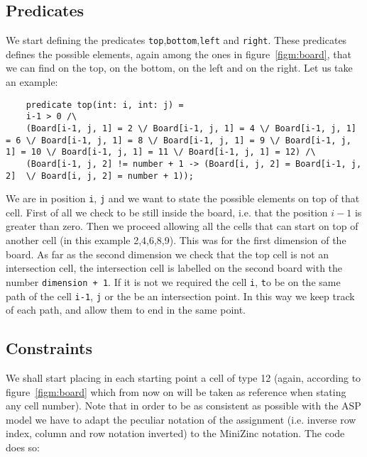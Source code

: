 \subsection{Predicates}\label{subsec:predicates}
We start defining the predicates \texttt{top},\texttt{bottom},\texttt{left} and \texttt{right}. These predicates defines the possible elements, again among the ones in figure~\ref{figm:board}, that we can find on the top, on the bottom, on the left and on the right.
Let us take an example:
\begin{verbatim}
    predicate top(int: i, int: j) =
    i-1 > 0 /\ 
    (Board[i-1, j, 1] = 2 \/ Board[i-1, j, 1] = 4 \/ Board[i-1, j, 1] = 6 \/ Board[i-1, j, 1] = 8 \/ Board[i-1, j, 1] = 9 \/ Board[i-1, j, 1] = 10 \/ Board[i-1, j, 1] = 11 \/ Board[i-1, j, 1] = 12) /\ 
    (Board[i-1, j, 2] != number + 1 -> (Board[i, j, 2] = Board[i-1, j, 2]  \/ Board[i, j, 2] = number + 1));
\end{verbatim}
We are in position \texttt{i}, \texttt{j} and we want to state the possible elements on top of that cell. First of all we check to be still inside the board, i.e. that the position $i-1$ is greater than zero. Then we proceed allowing all the cells that can start on top of another cell (in this example 2,4,6,8,9). This was for the first dimension of the board. As far as the second dimension we check that the top cell is not an intersection cell, the intersection cell is labelled on the second board with the number \texttt{dimension + 1}. If it is not we required the cell \texttt{i}, \texttt to be on the same path of the cell \texttt{i-1}, \texttt{j} or the be an intersection point. In this way we keep track of each path, and allow them to end in the same point.

\subsection{Constraints}
We shall start placing in each starting point a cell of type 12 (again, according to figure~\ref{figm:board} which from now on will be taken as reference when stating any cell number). Note that in order to be as consistent as possible with the ASP model we have to adapt the peculiar notation of the assignment (i.e. inverse row index, column and row notation inverted) to the MiniZinc notation. The code does so:

